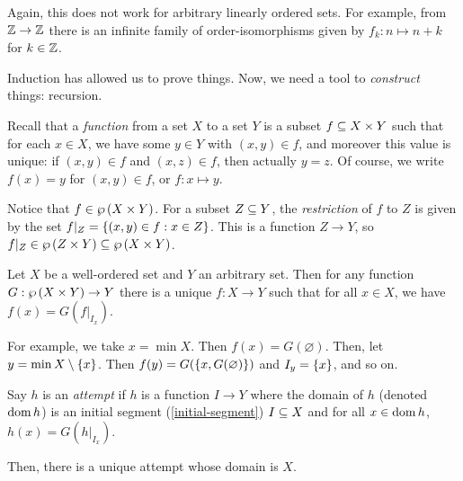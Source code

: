 \documentclass{article}
\begin{document}
\begin{note}
	Again, this does not work for arbitrary linearly ordered sets. For example, from $\mathbb{Z} \to \mathbb{Z}$ there is an infinite family of order-isomorphisms given by $f_k : n \mapsto n + k$ for $k \in \mathbb{Z}$.
\end{note}

Induction has allowed us to prove things. Now, we need a tool to \textit{construct} things: recursion.

\begin{remark}
    Recall that a \textit{function} from a set $X$ to a set $Y$ is a subset $f \subseteq X \times Y$ such that for each $x \in X$, we have some $y \in Y$ with $(x, y) \in f$, and moreover this value is unique: if $(x, y) \in f$ and $(x, z) \in f$, then actually $y = z$. Of course, we write $f(x) = y$ for $(x, y) \in f$, or $f: x \mapsto y$.

	Notice that $f \in \wp\left(X \times Y\right)$. For a subset $Z \subseteq Y$, the \textit{restriction} of $f$ to $Z$ is given by the set $f|_Z = \left\lbrace (x, y) \in f: x \in Z \right\rbrace$. This is a function $Z \to Y$, so $f|_Z \in \wp\left(Z \times Y\right) \subseteq \wp\left(X \times Y\right)$.
\end{remark}

\begin{theorem}
	\label{recursion}
    Let $X$ be a well-ordered set and $Y$ an arbitrary set. Then for any function $G: \wp\left(X \times Y\right) \to Y$ there is a unique $f: X \to Y$ such that for all $x \in X$, we have $f(x) = G(f|_{I_x})$.
    
    For example, we take $x = \min X$. Then $f(x) = G(\varnothing)$. Then, let $y = \min X \setminus \left\lbrace x \right\rbrace$. Then $f(y) = G(\left\lbrace x, G(\varnothing) \right\rbrace)$ and $I_y = \left\lbrace x \right\rbrace$, and so on.
    
    Say $h$ is an \textit{attempt} if $h$ is a function $I \to Y$ where the domain of $h$ (denoted $\operatorname{dom} h$) is an initial segment (\ref{initial-segment}) $I \subseteq X$ and for all $x \in \operatorname{dom} h$, $h(x) = G(h|_{I_x})$.
    
    Then, there is a unique attempt whose domain is $X$.
\end{theorem}
\end{document}
